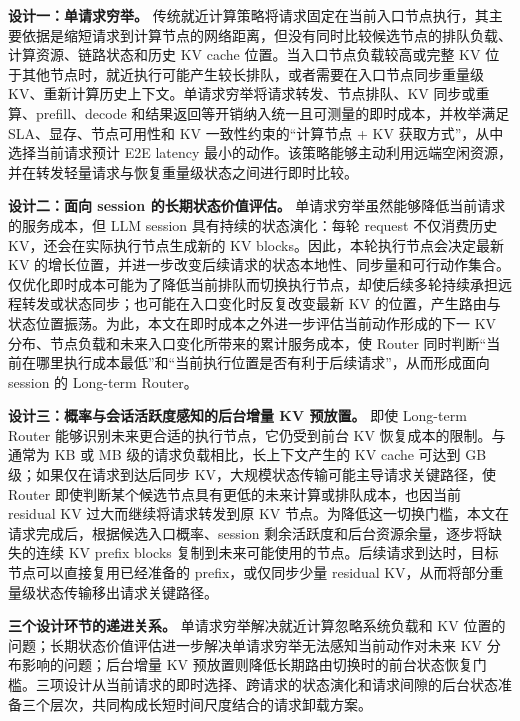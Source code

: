 \noindent\textbf{设计一：单请求穷举。}
传统就近计算策略将请求固定在当前入口节点执行，其主要依据是缩短请求到计算节点的网络距离，但没有同时比较候选节点的排队负载、计算资源、链路状态和历史 KV cache 位置。当入口节点负载较高或完整 KV 位于其他节点时，就近执行可能产生较长排队，或者需要在入口节点同步重量级 KV、重新计算历史上下文。单请求穷举将请求转发、节点排队、KV 同步或重算、prefill、decode 和结果返回等开销纳入统一且可测量的即时成本，并枚举满足 SLA、显存、节点可用性和 KV 一致性约束的“计算节点 + KV 获取方式”，从中选择当前请求预计 E2E latency 最小的动作。该策略能够主动利用远端空闲资源，并在转发轻量请求与恢复重量级状态之间进行即时比较。

\noindent\textbf{设计二：面向 session 的长期状态价值评估。}
单请求穷举虽然能够降低当前请求的服务成本，但 LLM session 具有持续的状态演化：每轮 request 不仅消费历史 KV，还会在实际执行节点生成新的 KV blocks。因此，本轮执行节点会决定最新 KV 的增长位置，并进一步改变后续请求的状态本地性、同步量和可行动作集合。仅优化即时成本可能为了降低当前排队而切换执行节点，却使后续多轮持续承担远程转发或状态同步；也可能在入口变化时反复改变最新 KV 的位置，产生路由与状态位置振荡。为此，本文在即时成本之外进一步评估当前动作形成的下一 KV 分布、节点负载和未来入口变化所带来的累计服务成本，使 Router 同时判断“当前在哪里执行成本最低”和“当前执行位置是否有利于后续请求”，从而形成面向 session 的 Long-term Router。

\noindent\textbf{设计三：概率与会话活跃度感知的后台增量 KV 预放置。}
即使 Long-term Router 能够识别未来更合适的执行节点，它仍受到前台 KV 恢复成本的限制。与通常为 KB 或 MB 级的请求负载相比，长上下文产生的 KV cache 可达到 GB 级；如果仅在请求到达后同步 KV，大规模状态传输可能主导请求关键路径，使 Router 即使判断某个候选节点具有更低的未来计算或排队成本，也因当前 residual KV 过大而继续将请求转发到原 KV 节点。为降低这一切换门槛，本文在请求完成后，根据候选入口概率、session 剩余活跃度和后台资源余量，逐步将缺失的连续 KV prefix blocks 复制到未来可能使用的节点。后续请求到达时，目标节点可以直接复用已经准备的 prefix，或仅同步少量 residual KV，从而将部分重量级状态传输移出请求关键路径。

\noindent\textbf{三个设计环节的递进关系。}
单请求穷举解决就近计算忽略系统负载和 KV 位置的问题；长期状态价值评估进一步解决单请求穷举无法感知当前动作对未来 KV 分布影响的问题；后台增量 KV 预放置则降低长期路由切换时的前台状态恢复门槛。三项设计从当前请求的即时选择、跨请求的状态演化和请求间隙的后台状态准备三个层次，共同构成长短时间尺度结合的请求卸载方案。

